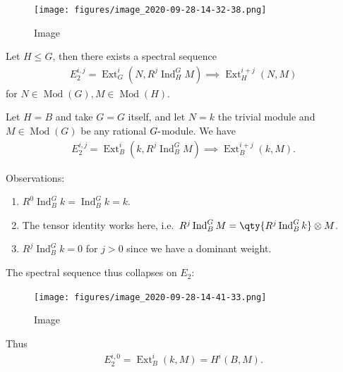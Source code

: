 \begin{figure}
\centering
\texttt{[image: figures/image\_2020-09-28-14-32-38.png]}
\caption{Image}
\end{figure}

\begin{proposition}[?]

\begin{proposition}[?]

Let \(H\leq G\), then there exists a spectral sequence
\begin{align*}   E^{i, j}_2 = \operatorname{Ext}_G^i(N, R^j \operatorname{Ind}_H^G M) \implies \operatorname{Ext}_H^{i+j}(N, M) \end{align*}
for \(N\in {\operatorname{Mod}}(G), M\in {\operatorname{Mod}}(H)\).

\end{proposition}

\end{proposition}

\begin{example}

\begin{example}

Let \(H=B\) and take \(G=G\) itself, and let \(N = k\) the trivial
module and \(M\in {\operatorname{Mod}}(G)\) be any rational
\(G{\hbox{-}}\)module. We have
\begin{align*}   E_2^{i, j} = \operatorname{Ext}^{i}_B(k, R^j \operatorname{Ind}_B^G M) \implies \operatorname{Ext}^{i+j}_B(k, M) .\end{align*}

Observations:

\begin{enumerate}
\def\labelenumi{\arabic{enumi}.}
\setcounter{enumi}{-1}
\item
  \(R^0 \operatorname{Ind}_B^G k = \operatorname{Ind}_B^G k = k\).
\item
  The tensor identity works here,
  i.e.~\(R^j \operatorname{Ind}_B^G M = \qty{R^j \operatorname{Ind}_B^G k} \otimes M\).
\item
  \(R^j \operatorname{Ind}_B^G k = 0\) for \(j> 0\) since we have a
  dominant weight.
\end{enumerate}

The spectral sequence thus collapses on \(E_2\):

\begin{figure}
\centering
\texttt{[image: figures/image\_2020-09-28-14-41-33.png]}
\caption{Image}
\end{figure}

Thus
\begin{align*}   E_2^{i, 0} = \operatorname{Ext}^i_B(k, M) = H^i(B, M) .\end{align*}

\end{example}

\end{example}

